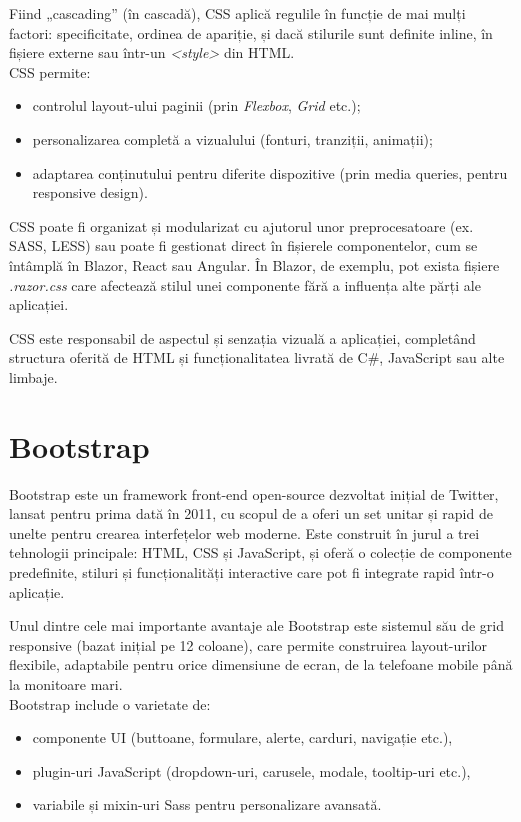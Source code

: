 Fiind „cascading” (în cascadă), CSS aplică regulile în funcție de mai mulți factori: specificitate, ordinea
de apariție, și dacă stilurile sunt definite inline, în fișiere externe sau într-un \textit{<style>} din HTML. \parencite{htmlcss}
\\CSS permite:
\begin{itemize}
    \item controlul layout-ului paginii (prin \textit{Flexbox}, \textit{Grid} etc.);
    \item personalizarea completă a vizualului (fonturi, tranziții, animații);
    \item adaptarea conținutului pentru diferite dispozitive (prin media queries, pentru responsive design).
\end{itemize}
\parencite{htmlcss}

CSS poate fi organizat și modularizat cu ajutorul unor preprocesatoare (ex. SASS, LESS)
sau poate fi gestionat direct în fișierele componentelor, cum se întâmplă în Blazor, React sau Angular. În
Blazor, de exemplu, pot exista fișiere \textit{.razor.css} care afectează stilul unei componente fără a influența alte
părți ale aplicației. \parencite{htmlcss}

CSS este responsabil de aspectul și senzația vizuală a aplicației, completând structura oferită
de HTML și funcționalitatea livrată de C\#, JavaScript sau alte limbaje. \parencite{htmlcss}

\section{Bootstrap}


Bootstrap este un framework front-end open-source dezvoltat inițial de Twitter, lansat pentru prima dată
în 2011, cu scopul de a oferi un set unitar și rapid de unelte pentru crearea interfețelor web moderne.
Este construit în jurul a trei tehnologii principale: HTML, CSS și JavaScript, și oferă o colecție de
componente predefinite, stiluri și funcționalități interactive care pot fi integrate rapid într-o aplicație. \parencite{htmlcss}

Unul dintre cele mai importante avantaje ale Bootstrap este sistemul său de grid responsive (bazat inițial
pe 12 coloane), care permite construirea layout-urilor flexibile, adaptabile pentru orice dimensiune de
ecran, de la telefoane mobile până la monitoare mari. \parencite{htmlcss}
\\Bootstrap include o varietate de:
\begin{itemize}
    \item componente UI (buttoane, formulare, alerte, carduri, navigație etc.),
    \item plugin-uri JavaScript (dropdown-uri, carusele, modale, tooltip-uri etc.),
    \item variabile și mixin-uri Sass pentru personalizare avansată.
\end{itemize}
\parencite{htmlcss}

